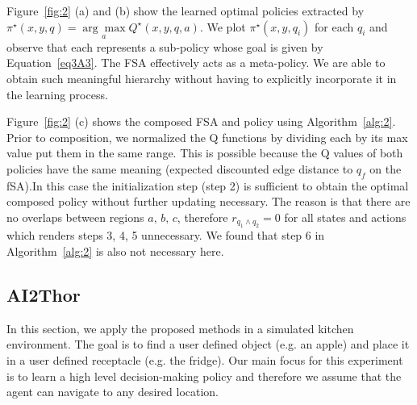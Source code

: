 \documentclass{article}
\begin{document}
Figure~\ref{fig:2} (a) and (b) show the learned optimal policies extracted by $\pi^\star(x,y,q) = \underset{a}{\arg\max}Q^\star(x,y,q,a)$. We plot $\pi^\star(x,y,q_i)$ for each $q_i$ and observe that each represents a sub-policy whose goal is given by Equation~\eqref{eq3A3}. The FSA effectively acts as a meta-policy. We are able to obtain such meaningful hierarchy without having to explicitly incorporate it in the learning process.

Figure~\ref{fig:2} (c) shows the composed FSA and policy using Algorithm~\ref{alg:2}. Prior to composition, we normalized the Q functions by dividing each by its max value put them in the same range. This is possible because the Q values of both policies have the same meaning (expected discounted edge distance to $q_f$ on the fSA).In this case the initialization step (step 2) is sufficient to obtain the optimal composed policy without further updating necessary. The reason is that there are no overlaps between regions $a,\, b,\, c$, therefore $r_{q_1 \wedge q_2}=0$ for all states and actions which renders steps 3, 4, 5 unnecessary. We found that step 6 in Algorithm~\ref{alg:2} is also not necessary here.


\subsection{AI2Thor}
\label{subsec:ai2thor}



In this section, we apply the proposed methods in a simulated kitchen environment. The goal is to find a user defined object (e.g. an apple) and place it in a user defined receptacle (e.g. the fridge). Our main focus for this experiment is to learn a high level decision-making policy and therefore we assume that the agent can navigate to any desired location. 
\end{document}
